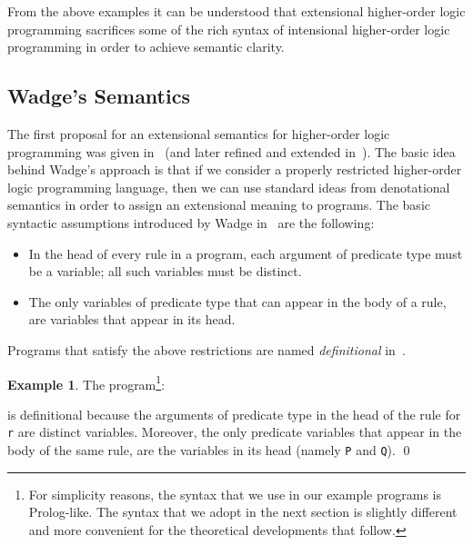\documentclass[submission,copyright]{eptcs}
\theoremstyle{definition}
\newtheorem{example}{Example}
\begin{document}
From the above examples it can be understood that extensional higher-order
logic programming sacrifices some of the rich syntax of intensional higher-order
logic programming in order to achieve semantic clarity.

\subsection{Wadge's Semantics}
The first proposal for an extensional semantics for higher-order logic programming
was given in~\cite{Wa91a} (and later refined and extended in~\cite{KRW05,CharalambidisHRW13,CharalambidisER14}).
The basic idea behind Wadge's approach is that if we consider a properly restricted
higher-order logic programming language, then we can use standard ideas from
denotational semantics in order to assign an extensional meaning to programs.
The basic syntactic assumptions introduced by Wadge in~\cite{Wa91a} are the following:
\begin{itemize}
\item In the head of every rule in a program, each argument of predicate type must be a variable; all such variables must be distinct.
\item The only variables of predicate type that can appear in the body of a
      rule, are variables that appear in its head.
\end{itemize}
Programs that satisfy the above restrictions are named {\em definitional} in~\cite{Wa91a}.
\begin{example}\label{example1}
The program\footnote{For simplicity reasons, the syntax that we use in our example programs is Prolog-like.
The syntax that we adopt in the next section is slightly different and more convenient for the theoretical
developments that follow.}:

is definitional because the arguments of predicate type in the head of the rule for {\tt r}
are distinct variables. Moreover, the only predicate variables that appear in the body of the
same rule, are the variables in its head (namely {\tt P} and {\tt Q}). \qed
\end{example}
\end{document}
